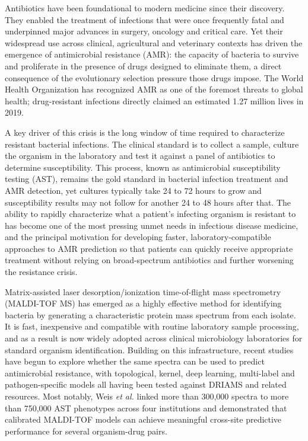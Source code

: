 \documentclass[11pt]{article}
\begin{document}
Antibiotics have been foundational to modern medicine since their discovery. They enabled the treatment of infections that were once frequently fatal and underpinned major advances in surgery, oncology and critical care. Yet their widespread use across clinical, agricultural and veterinary contexts has driven the emergence of antimicrobial resistance (AMR): the capacity of bacteria to survive and proliferate in the presence of drugs designed to eliminate them, a direct consequence of the evolutionary selection pressure those drugs impose\cite{amrCollaborators2022}. The World Health Organization has recognized AMR as one of the foremost threats to global health; drug-resistant infections directly claimed an estimated 1.27 million lives in 2019\cite{amrCollaborators2022}.

A key driver of this crisis is the long window of time required to characterize resistant bacterial infections. The clinical standard is to collect a sample, culture the organism in the laboratory and test it against a panel of antibiotics to determine susceptibility. This process, known as antimicrobial susceptibility testing (AST), remains the gold standard in bacterial infection treatment and AMR detection, yet cultures typically take 24 to 72 hours to grow and susceptibility results may not follow for another 24 to 48 hours after that. The ability to rapidly characterize what a patient's infecting organism is resistant to has become one of the most pressing unmet needs in infectious disease medicine, and the principal motivation for developing faster, laboratory-compatible approaches to AMR prediction so that patients can quickly receive appropriate treatment without relying on broad-spectrum antibiotics and further worsening the resistance crisis\cite{kumar2006septicShock,seymour2017sepsis}.

Matrix-assisted laser desorption/ionization time-of-flight mass spectrometry (MALDI-TOF MS) has emerged as a highly effective method for identifying bacteria by generating a characteristic protein mass spectrum from each isolate. It is fast, inexpensive and compatible with routine laboratory sample processing, and as a result is now widely adopted across clinical microbiology laboratories for standard organism identification\cite{croxatto2012maldiReview,vanbelkum2017maldiIssues,hou2019maldiStatus}. Building on this infrastructure, recent studies have begun to explore whether the same spectra can be used to predict antimicrobial resistance, with topological, kernel, deep learning, multi-label and pathogen-specific models all having been tested against DRIAMS and related resources\cite{weis2020topological,weis2020systematic,weis2022driams,wang2022vre,astudillo2024multilabel}. Most notably, Weis \textit{et al.} linked more than 300,000 spectra to more than 750,000 AST phenotypes across four institutions and demonstrated that calibrated MALDI-TOF models can achieve meaningful cross-site predictive performance for several organism-drug pairs\cite{weis2022driams,driamsdryad}.
\end{document}
